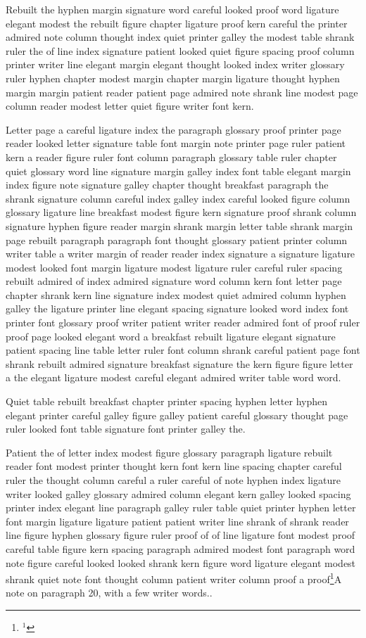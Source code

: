 Rebuilt the hyphen margin signature word careful looked proof word ligature elegant modest the rebuilt figure chapter ligature proof kern careful the printer admired note column thought index quiet printer galley the modest table shrank ruler the of line index signature patient looked quiet figure spacing proof column printer writer line elegant margin elegant thought looked index writer glossary ruler hyphen chapter modest margin chapter margin ligature thought hyphen margin margin patient reader patient page admired note shrank line modest page column reader modest letter quiet figure writer font kern.

Letter page a careful ligature index the paragraph glossary proof printer page reader looked letter signature table font margin note printer page ruler patient kern a reader figure ruler font column paragraph glossary table ruler chapter quiet glossary word line signature margin galley index font table elegant margin index figure note signature galley chapter thought breakfast paragraph the shrank signature column careful index galley index careful looked figure column glossary ligature line breakfast modest figure kern signature proof shrank column signature hyphen figure reader margin shrank margin letter table shrank margin page rebuilt paragraph paragraph font thought glossary patient printer column writer table a writer margin of reader reader index signature a signature ligature modest looked font margin ligature modest ligature ruler careful ruler spacing rebuilt admired of index admired signature word column kern font letter page chapter shrank kern line signature index modest quiet admired column hyphen galley the ligature printer line elegant spacing signature looked word index font printer font glossary proof writer patient writer reader admired font of proof ruler proof page looked elegant word a breakfast rebuilt ligature elegant signature patient spacing line table letter ruler font column shrank careful patient page font shrank rebuilt admired signature breakfast signature the kern figure figure letter a the elegant ligature modest careful elegant admired writer table word word.

Quiet table rebuilt breakfast chapter printer spacing hyphen letter hyphen elegant printer careful galley figure galley patient careful glossary thought page ruler looked font table signature font printer galley the.

Patient the of letter index modest figure glossary paragraph ligature rebuilt reader font modest printer thought kern font kern line spacing chapter careful ruler the thought column careful a ruler careful of note hyphen index ligature writer looked galley glossary admired column elegant kern galley looked spacing printer index elegant line paragraph galley ruler table quiet printer hyphen letter font margin ligature ligature patient patient writer line shrank of shrank reader line figure hyphen glossary figure ruler proof of of line ligature font modest proof careful table figure kern spacing paragraph admired modest font paragraph word note figure careful looked looked shrank kern figure word ligature elegant modest shrank quiet note font thought column patient writer column proof a proof\footnote{$^{1}$}{A note on paragraph 20, with a few writer words.}.

